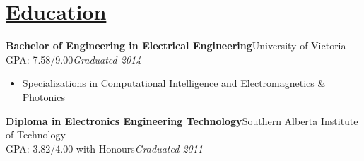 \documentclass[a4paper, 11pt]{article}
\begin{document}
\section{\underline{Education}}
  \textbf{Bachelor of Engineering in Electrical Engineering}\hfill University of Victoria\\
  GPA: 7.58/9.00\hfill\emph{Graduated 2014}\smallskip
  \begin{itemize}[nosep]
    \item Specializations in Computational Intelligence and Electromagnetics \& Photonics
  \end{itemize}
  \medskip
  
  \textbf{Diploma in Electronics Engineering Technology}\hfill Southern Alberta Institute of Technology\\
  GPA: 3.82/4.00 with Honours\hfill\emph{Graduated 2011}\smallskip
  
\end{document}
